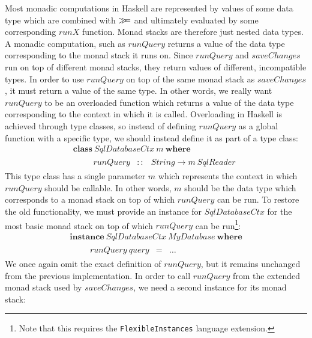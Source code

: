Most monadic computations in Haskell are represented by values of some data type which are combined with $\gg\!\!=$ and ultimately evaluated by some corresponding $\mathit{runX}$ function. Monad stacks are therefore just nested data types. A monadic computation, such as $\mathit{runQuery}$ returns a value of the data type corresponding to the monad stack it runs on. Since $\mathit{runQuery}$ and $\mathit{saveChanges}$ run on top of different monad stacks, they return values of different, incompatible types. In order to use $\mathit{runQuery}$ on top of the same monad stack as $\mathit{saveChanges}$, it must return a value of the same type. In other words, we really want $\mathit{runQuery}$ to be an overloaded function which returns a value of the data type corresponding to the context in which it is called. Overloading in Haskell is achieved through type classes, so instead of defining $\mathit{runQuery}$ as a global function with a specific type, we should instead define it as part of a type class:
\begin{displaymath}
\begin{array}{l}
\mathbf{class}~\mathit{SqlDatabaseCtx}~m~\mathbf{where}\\
\qquad \begin{array}{lcl}
\mathit{runQuery} & :: & \mathit{String} \to m~\mathit{SqlReader}
\end{array}
\end{array}
\end{displaymath}
This type class has a single parameter $m$ which represents the context in which $\mathit{runQuery}$ should be callable. In other words, $m$ should be the data type which corresponds to a monad stack on top of which $\mathit{runQuery}$ can be run. To restore the old functionality, we must provide an instance for $\mathit{SqlDatabaseCtx}$ for the most basic monad stack on top of which $\mathit{runQuery}$ can be run\footnote{Note that this requires the \texttt{FlexibleInstances} language extension.}:
\begin{displaymath}
\begin{array}{l}
\mathbf{instance}~\mathit{SqlDatabaseCtx}~\mathit{MyDatabase}~\mathbf{where}\\
\qquad \begin{array}{lcl}
\mathit{runQuery}~\mathit{query} & = & \ldots
\end{array}
\end{array}
\end{displaymath}
We once again omit the exact definition of $\mathit{runQuery}$, but it remains unchanged from the previous implementation. In order to call $\mathit{runQuery}$ from the extended monad stack used by $\mathit{saveChanges}$, we need a second instance for its monad stack:
